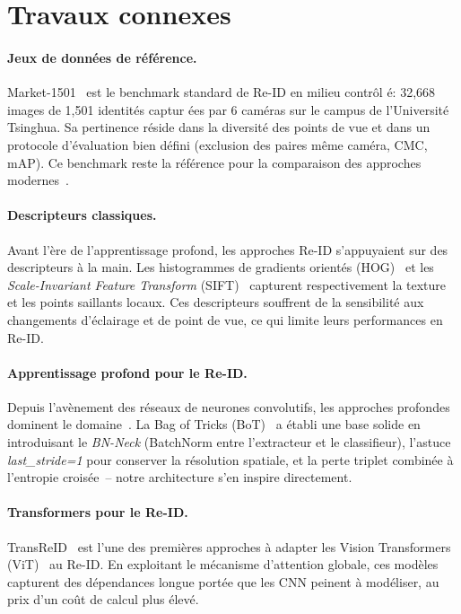 \section{Travaux connexes}
\label{sec:related}

\paragraph{Jeux de données de référence.}
Market-1501~\cite{zheng2015scalable} est le benchmark standard de Re-ID en milieu contrôl é: 32,668 images de 1,501 identités captur ées par 6 caméras sur le campus de l'Université Tsinghua. Sa pertinence réside dans la diversité des points de vue et dans un protocole d'évaluation bien défini (exclusion des paires même caméra, CMC, mAP). Ce benchmark reste la référence pour la comparaison des approches modernes~\cite{ye2021deep}.

\paragraph{Descripteurs classiques.}
Avant l'ère de l'apprentissage profond, les approches Re-ID s'appuyaient sur des descripteurs à la main. Les histogrammes de gradients orientés (HOG)~\cite{dalal2005histograms} et les \textit{Scale-Invariant Feature Transform} (SIFT)~\cite{lowe2004distinctive} capturent respectivement la texture et les points saillants locaux. Ces descripteurs souffrent de la sensibilité aux changements d'éclairage et de point de vue, ce qui limite leurs performances en Re-ID.

\paragraph{Apprentissage profond pour le Re-ID.}
Depuis l'avènement des réseaux de neurones convolutifs, les approches profondes dominent le domaine~\cite{ye2021deep}. La \og{}Bag of Tricks\fg{} (BoT)~\cite{luo2019bag} a établi une base solide en introduisant le \textit{BN-Neck} (BatchNorm entre l'extracteur et le classifieur), l'astuce \textit{last\_stride=1} pour conserver la résolution spatiale, et la perte triplet combinée à l'entropie croisée~-- notre architecture s'en inspire directement.

\paragraph{Transformers pour le Re-ID.}
TransReID~\cite{he2021transreid} est l'une des premières approches à adapter les Vision Transformers (ViT)~\cite{dosovitskiy2021image} au Re-ID. En exploitant le mécanisme d'attention globale, ces modèles capturent des dépendances longue portée que les CNN peinent à modéliser, au prix d'un co\^{u}t de calcul plus élevé.

